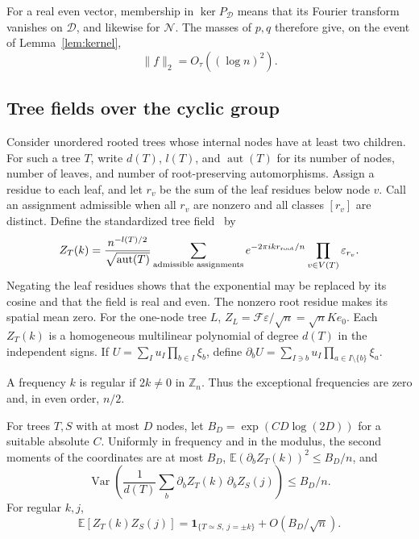 \documentclass[preprints,article,submit,oneauthor]{Definitions/mdpi}
\newcommand{\E}{\mathbb E}
\newcommand{\Z}{\mathbb Z}
\newcommand{\one}{\mathbf 1}
\newcommand{\Var}{\operatorname{Var}}
\newcommand{\aut}{\operatorname{aut}}
\newcommand{\norm}[1]{\lVert #1\rVert}
\begin{document}
For a real even vector, membership in \(\ker P_{\mathcal D}\) means
that its Fourier transform vanishes on \(\mathcal D\), and likewise
for \(\mathcal N\). The masses of \(p,q\) therefore give, on the event
of Lemma~\ref{lem:kernel},
\begin{equation}\label{eq:f-bound}
 \norm f_2=O_\tau((\log n)^2).
\end{equation}

\subsection{Tree fields over the cyclic group}

Consider unordered rooted trees whose internal nodes have at least
two children. For such a tree \(T\), write \(d(T)\), \(l(T)\), and
\(\aut(T)\) for its number of nodes, number of leaves, and number of
root-preserving automorphisms. Assign a residue to each leaf, and
let \(r_v\) be the sum of the leaf residues below node \(v\). Call an
assignment admissible when all \(r_v\) are nonzero and all classes
\([r_v]\) are distinct. Define the standardized tree field~\cite{CHHWY} by
\begin{equation}\label{eq:tree}
 Z_T(k)=\frac{n^{-l(T)/2}}{\sqrt{\aut(T)}}
       \sum_{\text{admissible assignments}}
             e^{-2\pi i k r_{\rm root}/n}\prod_{v\in V(T)}\varepsilon_{r_v}.
\end{equation}
Negating the leaf residues shows that the exponential may be replaced
by its cosine and that the field is real and even. The nonzero root
residue makes its spatial mean zero. For the one-node tree \(L\),
\(Z_L=\mathcal F\varepsilon/\sqrt n=\sqrt n K e_0\). Each \(Z_T(k)\)
is a homogeneous multilinear polynomial of degree \(d(T)\) in the
independent signs. If \(U=\sum_I u_I\prod_{b\in I}\xi_b\), define
\(\partial_b U=\sum_{I\ni b}u_I\prod_{a\in I\setminus\{b\}}\xi_a\).

A frequency \(k\) is regular if \(2k\ne0\) in \(\Z_n\). Thus the
exceptional frequencies are zero and, in even order, \(n/2\).

\begin{Lemma}\label{lem:tree-moments}
For trees \(T,S\) with at most \(D\) nodes, let
\(B_D=\exp(CD\log(2D))\) for a suitable absolute \(C\). Uniformly in
frequency and in the modulus, the second moments of the coordinates
are at most \(B_D\), \(\E(\partial_b Z_T(k))^2\le B_D/n\), and
\begin{equation}\label{eq:deriv-var}
 \Var\!\left(\frac{1}{d(T)}\sum_b
           \partial_b Z_T(k)\,\partial_b Z_S(j)\right)\le B_D/n.
\end{equation}
For regular \(k,j\),
\begin{equation}\label{eq:cov}
 \E[Z_T(k)Z_S(j)]=\one_{\{T\simeq S,\ j=\pm k\}}+O(B_D/\sqrt n).
\end{equation}
\end{Lemma}
\end{document}

